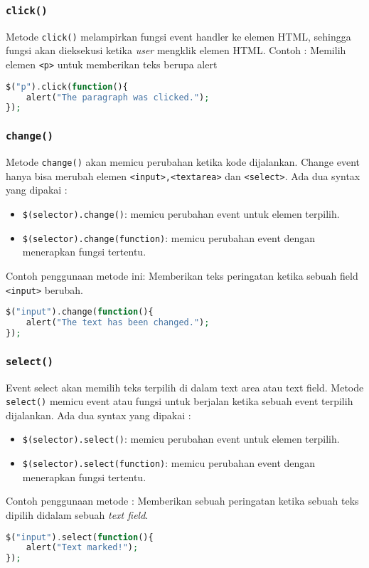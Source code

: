 \subsubsection{\texttt{click()}}
Metode \texttt{click()} melampirkan fungsi event handler ke elemen HTML, sehingga fungsi akan dieksekusi ketika \textit{user} mengklik elemen HTML.
Contoh : Memilih elemen \texttt{<p>} untuk memberikan teks berupa alert
\begin{lstlisting}[frame=single, language=PHP]
$("p").click(function(){
	alert("The paragraph was clicked.");
});

\end{lstlisting}

\subsubsection{\texttt{change()}}
Metode \texttt{change()} akan memicu perubahan ketika kode dijalankan. Change event hanya bisa merubah elemen \texttt{<input>,<textarea>} dan \texttt{<select>}.
Ada dua syntax yang dipakai :
\begin{itemize}
	\item \texttt{\$(selector).change()}: memicu perubahan event untuk elemen terpilih.
	\item \texttt{\$(selector).change(function)}: memicu perubahan event dengan menerapkan fungsi tertentu.
\end{itemize}
Contoh penggunaan metode ini: Memberikan teks peringatan ketika sebuah field \texttt{<input>} berubah.
\begin{lstlisting}[frame=single, language=PHP]
$("input").change(function(){
	alert("The text has been changed.");
});
\end{lstlisting}

\subsubsection{\texttt{select()}}
Event select akan memilih teks terpilih di dalam text area atau text field.
Metode \texttt{select()} memicu event atau fungsi untuk berjalan ketika sebuah event terpilih dijalankan.
Ada dua syntax yang dipakai :
\begin{itemize}
	\item \texttt{\$(selector).select()}: memicu perubahan event untuk elemen terpilih.
	\item \texttt{\$(selector).select(function)}: memicu perubahan event dengan menerapkan fungsi tertentu.
\end{itemize}
Contoh penggunaan metode : Memberikan sebuah peringatan ketika sebuah teks dipilih didalam sebuah \textit{text field}.
\begin{lstlisting}[frame=single, language=PHP]
$("input").select(function(){
	alert("Text marked!");
});
\end{lstlisting}

